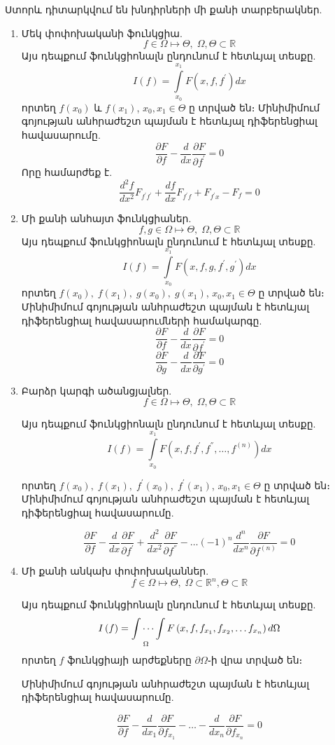 \documentclass[fleqn, bachelor,subf,12pt,notitlepage]{article}
\begin{document}
\newpage
Ստորև դիտարկվում են խնդիրների մի քանի տարբերակներ.
\begin{enumerate}
\item Մեկ փոփոխականի ֆունկցիա.
$$f \in \Omega \mapsto \Theta, \; \Omega, \Theta \subset \mathbb{R}$$
\noindent Այս դեպքում ֆունկցիոնալն ընդունում է հետևյալ տեսքը.
$$I\left(f\right) = \int\limits_{x_0}^{x_{1}} F\left(x, f, f^{'}\right)dx$$
\noindent որտեղ $f(x_{0})$ և $f(x_{1})$, $x_{0}, x_{1} \in \Theta$ ը տրված են։
\noindent Մինիմիմում գոյության անհրաժեշտ պայման է հետևյալ դիֆերենցիալ հավասարումը.
$$\dfrac{\partial F}{\partial f} - \dfrac{d}{dx}\dfrac{\partial F}{\partial f^{'}}=0$$
Որը համարժեք է.
$$\dfrac{d^{2}f}{dx^{2}}F_{f^{'}f^{'}}+\dfrac{df}{dx}F_{f^{'}f} + F_{f^{'}x}-F_{f}=0$$
\item Մի քանի անհայտ ֆունկցիաներ.
$$f,g \in \Omega \mapsto \Theta, \; \Omega, \Theta \subset \mathbb{R}$$
\noindent Այս դեպքում ֆունկցիոնալն ընդունում է հետևյալ տեսքը.
$$I\left(f\right) = \int\limits_{x_0}^{x_{1}} F\left(x, f, g, f^{'}, g^{'}\right)dx$$
\noindent որտեղ $f(x_{0}), \; f(x_{1}), \; g(x_{0}), \; g(x_{1})$, $x_{0}, x_{1} \in \Theta$ ը տրված են։
\noindent Մինիմիմում գոյության անհրաժեշտ պայման է հետևյալ դիֆերենցիալ հավասարումների համակարգը.
$$\dfrac{\partial F}{\partial f} - \dfrac{d}{dx}\dfrac{\partial F}{\partial f^{'}}=0$$
$$\dfrac{\partial F}{\partial g} - \dfrac{d}{dx}\dfrac{\partial F}{\partial g^{'}}=0$$
\item Բարձր կարգի ածանցյալներ.
$$f \in \Omega \mapsto \Theta, \; \Omega, \Theta \subset \mathbb{R}$$

\noindent Այս դեպքում ֆունկցիոնալն ընդունում է հետևյալ տեսքը.
$$I\left(f\right) = \int\limits_{x_0}^{x_{1}} F\left(x, f, f^{'}, f^{''}, \dots, f^{(n)}\right)dx$$

\noindent որտեղ $f(x_{0}), \; f(x_{1}), \; f^{'}(x_{0}), \; f^{'}(x_{1})$, $x_{0}, x_{1} \in \Theta$ ը տրված են։
\noindent Մինիմիմում գոյության անհրաժեշտ պայման է հետևյալ դիֆերենցիալ հավասարումը.

$$\dfrac{\partial F}{\partial f} - \dfrac{d}{dx}\dfrac{\partial F}{\partial f^{'}} + \dfrac{d^{2}}{dx^{2}}\dfrac{\partial F}{\partial f^{''}} - \dots (-1)^{n}\dfrac{d^{n}}{dx^{n}}\dfrac{\partial F}{\partial f^{(n)}}=0$$

\item Մի քանի անկախ փոփոխականներ.
$$f \in \Omega \mapsto \Theta, \; \Omega \subset \mathbb{R}^{n}, \Theta \subset \mathbb{R}$$

\noindent Այս դեպքում ֆունկցիոնալն ընդունում է հետևյալ տեսքը.
$$I\left(f\right) = \idotsint \limits_{\Omega} F\left(x, f, f_{x_{1}}, f_{x_{2}}, \dots f_{x_{n} }\right)d\Omega$$
\noindent որտեղ $f$ ֆունկցիայի արժեքները $\partial \Omega$֊ի վրա տրված են։

\noindent Մինիմիմում գոյության անհրաժեշտ պայման է հետևյալ դիֆերենցիալ հավասարումը.

$$\dfrac{\partial F}{\partial f} - \dfrac{d}{dx_{1}}\dfrac{\partial F}{\partial f_{x_{1}}} - \dots -\dfrac{d}{dx_{n}}\dfrac{\partial F}{\partial f_{x_{n}}}=0$$
\end{enumerate}
\newpage
\end{document}
